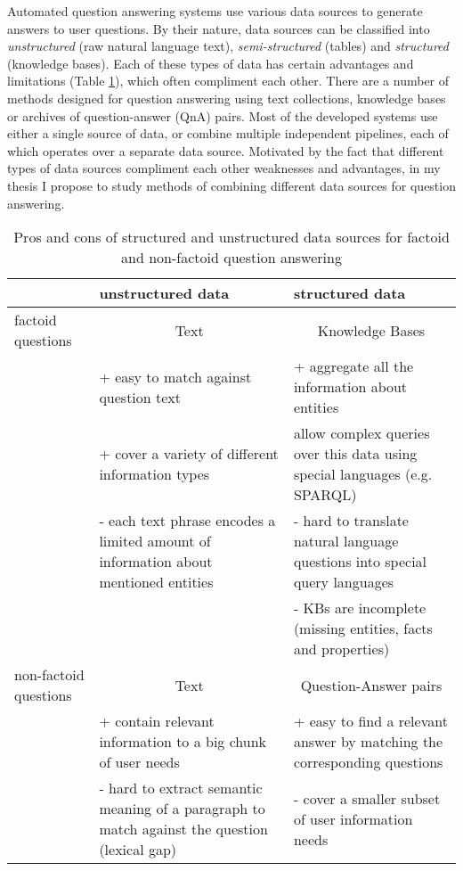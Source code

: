 Automated question answering systems use various data sources to generate answers to user questions.
By their nature, data sources can be classified into \textit{unstructured} (\eg raw natural language text), \textit{semi-structured} (\eg tables) and \textit{structured} (\eg knowledge bases).
Each of these types of data has certain advantages and limitations (Table \ref{table:data_procons}), which often compliment each other.
There are a number of methods designed for question answering using text collections, knowledge bases or archives of question-answer (QnA) pairs.
Most of the developed systems use either a single source of data, or combine multiple independent pipelines, each of which operates over a separate data source.
Motivated by the fact that different types of data sources compliment each other weaknesses and advantages, in my thesis I propose to study methods of combining different data sources for question answering.

\begin{table}
\centering
\begin{tabular}{| l | p{6cm} | p{6cm} |}
\hline
 & unstructured data & structured data \\
\hline
factoid questions & \multicolumn{1}{|c|}{Text} & \multicolumn{1}{|c|}{Knowledge Bases} \\
 & + easy to match against question text & + aggregate all the information about entities\\
 & + cover a variety of different information types & allow complex queries over this data using special languages (e.g. SPARQL) \\
 & - each text phrase encodes a limited amount of information about mentioned entities & - hard to translate natural language questions into special query languages \\
&  & - KBs are incomplete (missing entities, facts and properties) \\
\hline
non-factoid questions & \multicolumn{1}{|c|}{Text} & \multicolumn{1}{|c|}{Question-Answer pairs} \\
 & + contain relevant information to a big chunk of user needs & + easy to find a relevant answer by matching the corresponding questions \\
 & - hard to extract semantic meaning of a paragraph to match against the question (lexical gap) & - cover a smaller subset of user information needs \\
\hline
\end{tabular}
\caption{Pros and cons of structured and unstructured data sources for factoid and non-factoid question answering}
\label{table:data_procons}
\end{table}

